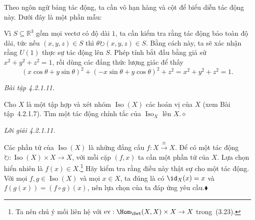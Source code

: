 Theo ngôn ngữ bảng tác động, ta cần vô hạn hàng và cột để biểu diễn tác động này. Dưới đây là một phần mẫu:
\begin{center}
\end{center}

Vì $S\subseteq\mathbb{R}^3$ gồm mọi vectơ có độ dài $1$, ta cần kiểm tra rằng tác động bảo toàn độ dài, tức nếu $(x,y,z)\in S$ thì $\theta\circlearrowright(x,y,z)\in S$. Bằng cách này, ta sẽ xác nhận rằng $U(1)$ thực sự tác động lên $S$. Phép tính bắt đầu bằng giả sử $x^2+y^2+z^2=1$, rồi dùng các đẳng thức lượng giác để thấy
\[
(x\cos\theta+y\sin\theta)^2+(-x\sin\theta+y\cos\theta)^2+z^2
=x^2+y^2+z^2=1.
\]

\noindent\textit{Bài tập 4.2.1.11.}\keepwithnext

Cho $X$ là một tập hợp và xét nhóm $\operatorname{Iso}(X)$ các hoán vị của $X$ (xem Bài tập~4.2.1.7). Tìm một tác động chính tắc của $\operatorname{Iso}_X$ lên $X$.\hfill$\diamond$

\noindent\textit{Lời giải 4.2.1.11.}\keepwithnext

Các phần tử của $\operatorname{Iso}(X)$ là những đẳng cấu $f:X\xrightarrow{\cong}X$. Để có một tác động $\circlearrowright:\operatorname{Iso}(X)\times X\to X$, với mỗi cặp $(f,x)$ ta cần một phần tử của $X$. Lựa chọn hiển nhiên là $f(x)\in X$.\footnote{Ta nên chú ý mối liên hệ với $\mathrm{ev}:\Hom_{\Set}(X,X)\times X\to X$ trong~(3.23).} Hãy kiểm tra rằng điều này thật sự cho một tác động. Với mọi $f,g\in\operatorname{Iso}(X)$ và mọi $x\in X$, ta đúng là có $\id_X(x)=x$ và $f(g(x))=(f\circ g)(x)$, nên lựa chọn của ta đáp ứng yêu cầu.\hfill$\blacklozenge$

